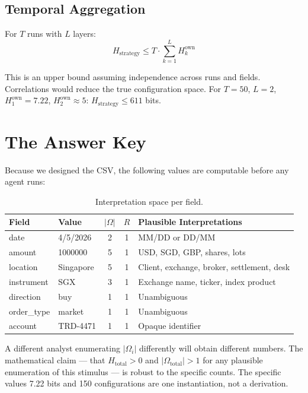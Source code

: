 \documentclass[11pt,a4paper]{article}
\begin{document}
\subsection{Temporal Aggregation}

For $T$ runs with $L$ layers:
\[
H_{\text{strategy}} \leq T \cdot \sum_{k=1}^{L} H_k^{\text{own}}
\]

This is an upper bound assuming independence across runs and fields. 
Correlations would reduce the true configuration space. For 
$T = 50$, $L = 2$, $H_1^{\text{own}} = 7.22$, 
$H_2^{\text{own}} \approx 5$:
$H_{\text{strategy}} \leq 611$ bits.


\section{The Answer Key}
\label{sec:answer}

Because we designed the CSV, the following values are computable 
before any agent runs:

\begin{table}[h]
\centering
\begin{tabular}{@{}llccl@{}}
\toprule
\textbf{Field} & \textbf{Value} & $|\Omega|$ & $R$ & 
\textbf{Plausible Interpretations} \\
\midrule
date       & 4/5/2026   & 2 & 1 & MM/DD or DD/MM \\
amount     & 1000000    & 5 & 1 & USD, SGD, GBP, shares, lots \\
location   & Singapore  & 5 & 1 & Client, exchange, broker, settlement, desk \\
instrument & SGX        & 3 & 1 & Exchange name, ticker, index product \\
direction  & buy        & 1 & 1 & Unambiguous \\
order\_type & market     & 1 & 1 & Unambiguous \\
account    & TRD-4471   & 1 & 1 & Opaque identifier \\
\bottomrule
\end{tabular}
\caption{Interpretation space per field.}
\end{table}

A different analyst enumerating $|\Omega_i|$ differently will obtain 
different numbers. The mathematical claim --- that $H_{\text{total}} > 0$ 
and $|\Omega_{\text{total}}| > 1$ for any plausible enumeration of 
this stimulus --- is robust to the specific counts. The specific 
values 7.22 bits and 150 configurations are one instantiation, not 
a derivation.
\end{document}
